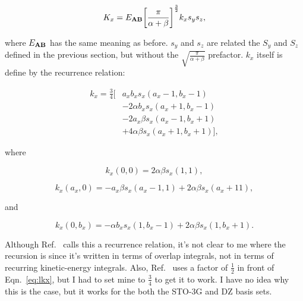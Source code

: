 \documentclass{achemso}
\newcommand\eab{E_{\vb A \vb B}}
\begin{document}
\begin{equation}
  \label{eq:kx}
  K_x = \eab \bigg[ \frac{\pi}{\alpha + \beta} \bigg]^\frac{3}{2}
  k_xs_ys_z,
\end{equation}

\noindent
where $\eab$ has the same meaning as before. $s_y$ and $s_z$ are related the
$S_y$ and $S_z$ defined in the previous section, but without the
$\sqrt{\frac{\pi}{\alpha + \beta}}$ prefactor. $k_x$ itself is define by the
recurrence relation:

\begin{align}
  \label{eq:lkx}
  k_x = \frac{3}{4}
  \big [
  & a_xb_xs_x(a_x-1,b_x-1) \\
  &- 2 \alpha b_x s_x(a_x + 1, b_x-1) \nonumber \\
  &- 2 a_x \beta s_x(a_x - 1, b_x + 1) \nonumber \\
  &+ 4 \alpha \beta s_x(a_x + 1, b_x + 1) \nonumber
  \big ],
\end{align}

\noindent
where

\begin{equation}
  \label{eq:kx00}
  k_x(0,0) = 2 \alpha \beta s_x(1,1),
\end{equation}

\begin{equation}
  \label{eq:kxa0}
  k_x(a_x,0) = - a_x \beta s_x(a_x -1,1)+2\alpha\beta s_x(a_x +1 1),
\end{equation}

\noindent and

\begin{equation}
  \label{eq:kx0b}
  k_x(0, b_x) = - \alpha b_x s_x(1, b_x-1) + 2 \alpha \beta s_x(1, b_x + 1).
\end{equation}

Although Ref.~ calls this a recurrence relation, it's not clear to
me where the recursion is since it's written in terms of overlap integrals, not
in terms of recurring kinetic-energy integrals. Also, Ref.~ uses a
factor of $\frac{1}{2}$ in front of Eqn.~\ref{eq:lkx}, but I had to set mine to
$\frac{3}{4}$ to get it to work. I have no idea why this is the case, but it
works for the both the STO-3G and DZ basis sets.


\end{document}
